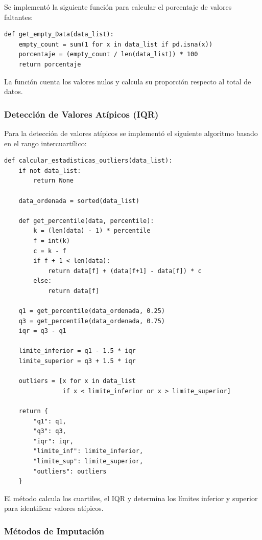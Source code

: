 \documentclass[12pt]{article}
\begin{document}
Se implementó la siguiente función para calcular el porcentaje de valores faltantes:

\begin{lstlisting}[caption=Funcion para calcular porcentaje de datos faltantes, label=lst:missing]
def get_empty_Data(data_list):
    empty_count = sum(1 for x in data_list if pd.isna(x))
    porcentaje = (empty_count / len(data_list)) * 100
    return porcentaje
\end{lstlisting}

La función cuenta los valores nulos y calcula su proporción respecto al total de datos.

\subsubsection{Detección de Valores Atípicos (IQR)}

Para la detección de valores atípicos se implementó el siguiente algoritmo basado en el rango intercuartílico:

\begin{lstlisting}[caption=Deteccion de valores atipicos mediante IQR, label=lst:iqr]
def calcular_estadisticas_outliers(data_list):
    if not data_list:
        return None

    data_ordenada = sorted(data_list)

    def get_percentile(data, percentile):
        k = (len(data) - 1) * percentile
        f = int(k)
        c = k - f
        if f + 1 < len(data):
            return data[f] + (data[f+1] - data[f]) * c
        else:
            return data[f]

    q1 = get_percentile(data_ordenada, 0.25)
    q3 = get_percentile(data_ordenada, 0.75)
    iqr = q3 - q1

    limite_inferior = q1 - 1.5 * iqr
    limite_superior = q3 + 1.5 * iqr

    outliers = [x for x in data_list 
                if x < limite_inferior or x > limite_superior]

    return {
        "q1": q1,
        "q3": q3,
        "iqr": iqr,
        "limite_inf": limite_inferior,
        "limite_sup": limite_superior,
        "outliers": outliers
    }
\end{lstlisting}

El método calcula los cuartiles, el IQR y determina los límites inferior y superior para identificar valores atípicos.

\subsubsection{Métodos de Imputación}
\end{document}
